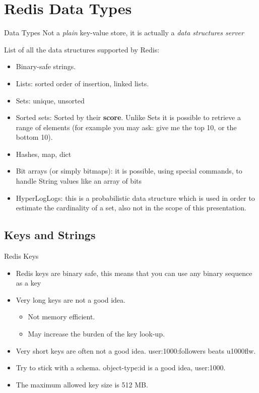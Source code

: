 \documentclass[10pt]{beamer}
\begin{document}
\section{Redis Data Types}

\begin{frame}[fragile]{Data Types}
  Not a \textit{plain} key-value store, it is actually a \textit{data structures
   server}

  List of all the data structures supported by Redis:
  \begin{itemize}
		\item Binary-safe strings.
		\item Lists: sorted order of insertion, linked lists.
		\item Sets: unique, unsorted
    \item Sorted sets: Sorted by their \textbf{score}. Unlike Sets it is
    possible to retrieve a range of elements (for example you may ask: give me
    the top 10, or the bottom 10).
    \item Hashes, map, dict
    \item Bit arrays (or simply bitmaps): it is possible, using special commands,
    to handle String values like an array of bits
    \item HyperLogLogs: this is a probabilistic data structure which is used in
    order to estimate the cardinality of a set, also not in the scope of this
    presentation.
	\end{itemize}
\end{frame}

\subsection{Keys and Strings}

\begin{frame}[fragile]{Redis Keys}
  \begin{itemize}
    \item Redis keys are binary safe, this means that you can use any binary
    sequence as a key
    \item Very long keys are not a good idea.
      \begin{itemize}
        \item Not memory efficient.
        \item May increase the burden of the key look-up.
      \end{itemize}
    \item Very short keys are often not a good idea. user:1000:followers beats
    u1000flw.
    \item Try to stick with a schema. object-type:id is a good idea, user:1000.
    \item The maximum allowed key size is 512 MB.
  \end{itemize}
\end{frame}
\end{document}
